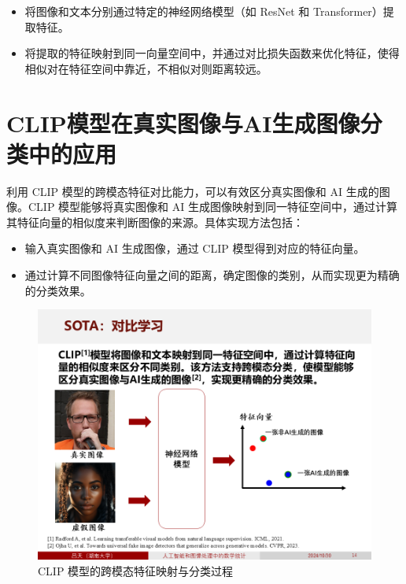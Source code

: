 \documentclass[
    report,     %
    oneside,    %
    UTF8,       %
    zihao=-4    %
]{config} %
\begin{document}
\begin{itemize}
    \item 将图像和文本分别通过特定的神经网络模型（如 ResNet\cite{resnet} 和 Transformer\cite{ViT}）提取特征。
    \item 将提取的特征映射到同一向量空间中，并通过对比损失函数来优化特征，使得相似对在特征空间中靠近，不相似对则距离较远。
\end{itemize}

\section{CLIP模型在真实图像与AI生成图像分类中的应用}

利用 CLIP 模型的跨模态特征对比能力，可以有效区分真实图像和 AI 生成的图像\cite{universalfakedetect}。CLIP 模型能够将真实图像和 AI 生成图像映射到同一特征空间中，通过计算其特征向量的相似度来判断图像的来源。具体实现方法包括：

\begin{itemize}
    \item 输入真实图像和 AI 生成图像，通过 CLIP 模型得到对应的特征向量。
    \item 通过计算不同图像特征向量之间的距离，确定图像的类别，从而实现更为精确的分类效果。
\end{itemize}

\begin{figure}[H]
    \centering
    \includegraphics[width=\linewidth]{figures/基于对比学习的跨模态分类/1.PNG}
    \caption{CLIP 模型的跨模态特征映射与分类过程}
\end{figure}
\end{document}
